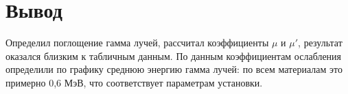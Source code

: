 \documentclass[a4paper]{article}
\begin{document}



\newpage

\section{Вывод}

Определил поглощение гамма лучей, рассчитал коэффициенты $\mu$ и $\mu '$, результат оказался близким к табличным данным. По данным коэффициентам ослабления определили по графику среднюю энергию гамма лучей:
по всем материалам это примерно 0,6 МэВ, что соответствует параметрам установки.
\end{document}
